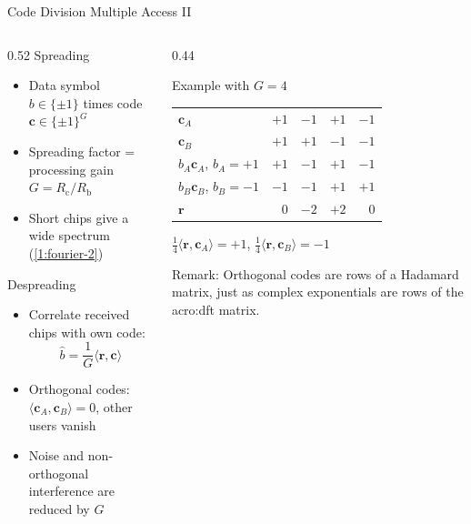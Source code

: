 \begin{frame}{Code Division Multiple Access II}
  \begin{columns}[T,onlytextwidth]
    \begin{column}{0.52\textwidth}
      Spreading
      \begin{itemize}
        \item Data symbol $b \in \{\pm 1\}$ times code $\mathbf{c} \in \{\pm 1\}^G$
        \item Spreading factor = processing gain $G = R_\mathrm{c}/R_\mathrm{b}$
        \item Short chips give a wide spectrum (\cref{1:fourier-2})
      \end{itemize}
      \vspace{0.4em}
      Despreading
      \begin{itemize}
        \item Correlate received chips with own code:
          \begin{equation*}
            \hat{b} = \frac{1}{G}\langle \mathbf{r}, \mathbf{c} \rangle
          \end{equation*}
        \item Orthogonal codes: $\langle \mathbf{c}_A, \mathbf{c}_B \rangle = 0$, other users vanish
        \item Noise and non-orthogonal interference are reduced by $G$
      \end{itemize}
    \end{column}
    \begin{column}{0.44\textwidth}
      \begin{block}{Example with $G = 4$}
        \centering
        \footnotesize
        \begin{tabular}{l|rrrr}
          $\mathbf{c}_A$ & $+1$ & $-1$ & $+1$ & $-1$ \\
          $\mathbf{c}_B$ & $+1$ & $+1$ & $-1$ & $-1$ \\
          \hline
          $b_A \mathbf{c}_A$, $b_A = +1$ & $+1$ & $-1$ & $+1$ & $-1$ \\
          $b_B \mathbf{c}_B$, $b_B = -1$ & $-1$ & $-1$ & $+1$ & $+1$ \\
          \hline
          $\mathbf{r}$ & $0$ & $-2$ & $+2$ & $0$ \\
        \end{tabular}

        \vspace{0.4em}
        $\frac{1}{4}\langle \mathbf{r}, \mathbf{c}_A \rangle = +1$, \quad $\frac{1}{4}\langle \mathbf{r}, \mathbf{c}_B \rangle = -1$
      \end{block}
      \alert{Remark:} Orthogonal codes are rows of a Hadamard matrix, just as complex exponentials are rows of the \gls{acro:dft} matrix.
    \end{column}
  \end{columns}
\end{frame}


